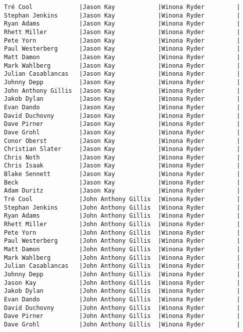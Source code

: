 \documentclass{article}
\begin{document}
\begin{verbatim}
Tré Cool             |Jason Kay            |Winona Ryder         |
Stephan Jenkins      |Jason Kay            |Winona Ryder         |
Ryan Adams           |Jason Kay            |Winona Ryder         |
Rhett Miller         |Jason Kay            |Winona Ryder         |
Pete Yorn            |Jason Kay            |Winona Ryder         |
Paul Westerberg      |Jason Kay            |Winona Ryder         |
Matt Damon           |Jason Kay            |Winona Ryder         |
Mark Wahlberg        |Jason Kay            |Winona Ryder         |
Julian Casablancas   |Jason Kay            |Winona Ryder         |
Johnny Depp          |Jason Kay            |Winona Ryder         |
John Anthony Gillis  |Jason Kay            |Winona Ryder         |
Jakob Dylan          |Jason Kay            |Winona Ryder         |
Evan Dando           |Jason Kay            |Winona Ryder         |
David Duchovny       |Jason Kay            |Winona Ryder         |
Dave Pirner          |Jason Kay            |Winona Ryder         |
Dave Grohl           |Jason Kay            |Winona Ryder         |
Conor Oberst         |Jason Kay            |Winona Ryder         |
Christian Slater     |Jason Kay            |Winona Ryder         |
Chris Noth           |Jason Kay            |Winona Ryder         |
Chris Isaak          |Jason Kay            |Winona Ryder         |
Blake Sennett        |Jason Kay            |Winona Ryder         |
Beck                 |Jason Kay            |Winona Ryder         |
Adam Duritz          |Jason Kay            |Winona Ryder         |
Tré Cool             |John Anthony Gillis  |Winona Ryder         |
Stephan Jenkins      |John Anthony Gillis  |Winona Ryder         |
Ryan Adams           |John Anthony Gillis  |Winona Ryder         |
Rhett Miller         |John Anthony Gillis  |Winona Ryder         |
Pete Yorn            |John Anthony Gillis  |Winona Ryder         |
Paul Westerberg      |John Anthony Gillis  |Winona Ryder         |
Matt Damon           |John Anthony Gillis  |Winona Ryder         |
Mark Wahlberg        |John Anthony Gillis  |Winona Ryder         |
Julian Casablancas   |John Anthony Gillis  |Winona Ryder         |
Johnny Depp          |John Anthony Gillis  |Winona Ryder         |
Jason Kay            |John Anthony Gillis  |Winona Ryder         |
Jakob Dylan          |John Anthony Gillis  |Winona Ryder         |
Evan Dando           |John Anthony Gillis  |Winona Ryder         |
David Duchovny       |John Anthony Gillis  |Winona Ryder         |
Dave Pirner          |John Anthony Gillis  |Winona Ryder         |
Dave Grohl           |John Anthony Gillis  |Winona Ryder         |

\end{verbatim}
\end{document}
